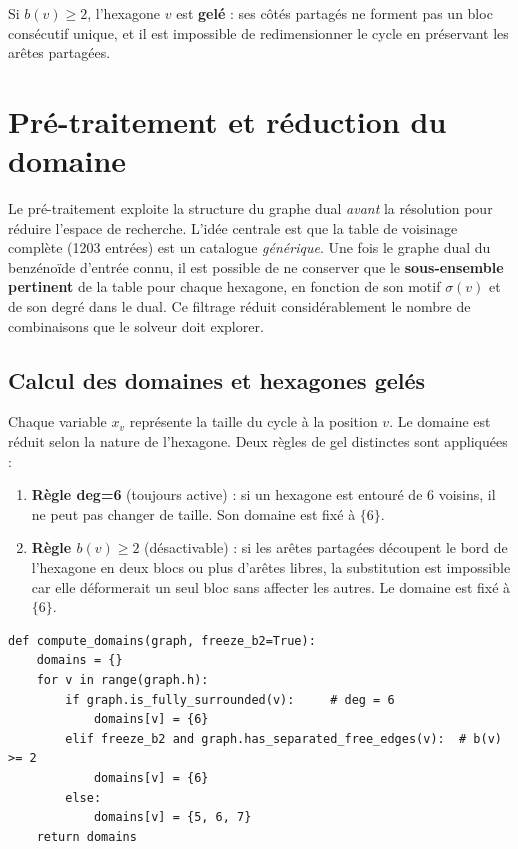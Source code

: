 \documentclass[12pt,a4paper]{article}
\theoremstyle{definition}
\begin{document}
Si $b(v) \geq 2$, l'hexagone $v$ est \textbf{gelé} : ses côtés partagés ne forment pas un
bloc consécutif unique, et il est impossible de redimensionner le cycle en préservant les
arêtes partagées.

\section{Pré-traitement et réduction du domaine}

Le pré-traitement exploite la structure du graphe dual \textit{avant} la résolution pour
réduire l'espace de recherche. L'idée centrale est que la table de voisinage complète (1203
entrées) est un catalogue \textit{générique}. Une fois le graphe dual du benzénoïde d'entrée
connu, il est possible de ne conserver que le \textbf{sous-ensemble pertinent} de la table pour
chaque hexagone, en fonction de son motif $\sigma(v)$ et de son degré dans le dual. Ce filtrage
réduit considérablement le nombre de combinaisons que le solveur doit explorer.

\subsection{Calcul des domaines et hexagones gelés}

Chaque variable $x_v$ représente la taille du cycle à la position $v$. Le domaine est réduit
selon la nature de l'hexagone. Deux règles de gel distinctes sont appliquées :

\begin{enumerate}
  \item \textbf{Règle deg=6} (toujours active) : si un hexagone est entouré de 6 voisins,
    il ne peut pas changer de taille. Son domaine est fixé à $\{6\}$.
  \item \textbf{Règle $b(v) \geq 2$} (désactivable) : si les arêtes partagées découpent le
    bord de l'hexagone en deux blocs ou plus d'arêtes libres, la substitution est impossible
    car elle déformerait un seul bloc sans affecter les autres. Le domaine est fixé à $\{6\}$.
\end{enumerate}

\begin{lstlisting}
def compute_domains(graph, freeze_b2=True):
    domains = {}
    for v in range(graph.h):
        if graph.is_fully_surrounded(v):     # deg = 6
            domains[v] = {6}
        elif freeze_b2 and graph.has_separated_free_edges(v):  # b(v) >= 2
            domains[v] = {6}
        else:
            domains[v] = {5, 6, 7}
    return domains
\end{lstlisting}
\end{document}
